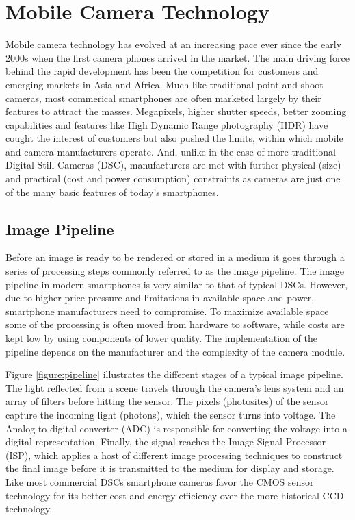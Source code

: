 \documentclass[thesis.tex]{subfiles}
\begin{document}
\section{Mobile Camera Technology}
\label{section:mobile_camera_technology}
Mobile camera technology has evolved at an increasing pace ever since the early 2000s when the first camera phones arrived in the market. The main driving force behind the rapid development has been the competition for customers and emerging markets in Asia and Africa. Much like traditional point-and-shoot cameras, most commerical smartphones are often marketed largely by their features to attract the masses. Megapixels, higher shutter speeds, better zooming capabilities and features like High Dynamic Range photography (HDR) have cought the interest of customers but also pushed the limits, within which mobile and camera manufacturers operate. And, unlike in the case of more traditional Digital Still Cameras (DSC), manufacturers are met with further physical (size) and practical (cost and power consumption) constraints as cameras are just one of the many basic features of today's smartphones.

\subsection{Image Pipeline}
Before an image is ready to be rendered or stored in a medium it goes through a series of processing steps commonly referred to as the image pipeline. The image pipeline in modern smartphones is very similar to that of typical DSCs. However, due to higher price pressure and limitations in available space and power, smartphone manufacturers need to compromise. To maximize available space some of the processing is often moved from hardware to software, while costs are kept low by using components of lower quality. The implementation of the pipeline depends on the manufacturer and the complexity of the camera module.

Figure \ref{figure:pipeline} illustrates the different stages of a typical image pipeline. The light reflected from a scene travels through the camera's lens system and an array of filters before hitting the sensor. The pixels (photosites) of the sensor capture the incoming light (photons), which the sensor turns into voltage. The Analog-to-digital converter (ADC) is responsible for converting the voltage into a digital representation. Finally, the signal reaches the Image Signal Processor (ISP), which applies a host of different image processing techniques to construct the final image before it is transmitted to the medium for display and storage. Like most commercial DSCs smartphone cameras favor the CMOS sensor technology for its better cost and energy efficiency over the more historical CCD technology.
\end{document}
